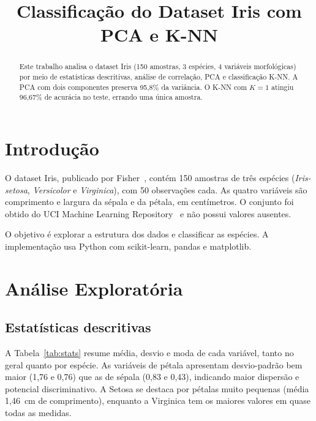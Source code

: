 \documentclass[conference]{IEEEtran}
\title{Classificação do Dataset Iris com PCA e K-NN}
\author{
\IEEEauthorblockN{Felipe Duarte Silva \quad Paulo Henrique Jankosz}
\IEEEauthorblockA{
GRR20231957 \quad GRR20220627\\
Departamento de Informática -- UFPR}
}
\begin{document}
\maketitle

\begin{abstract}
Este trabalho analisa o dataset Iris (150 amostras, 3 espécies, 4
variáveis morfológicas) por meio de estatísticas descritivas, análise de
correlação, PCA e classificação K-NN. A PCA com dois componentes
preserva 95,8\% da variância. O K-NN com $K=1$ atingiu 96,67\% de
acurácia no teste, errando uma única amostra.
\end{abstract}

\section{Introdução}

O dataset Iris, publicado por Fisher~\cite{fisher1936}, contém 150
amostras de três espécies (\textit{Iris-setosa}, \textit{Versicolor} e
\textit{Virginica}), com 50 observações cada. As quatro variáveis são
comprimento e largura da sépala e da pétala, em centímetros. O conjunto
foi obtido do UCI Machine Learning Repository~\cite{uci_iris} e não
possui valores ausentes.

O objetivo é explorar a estrutura dos dados e classificar as espécies.
A implementação usa Python com scikit-learn, pandas e
matplotlib.

\section{Análise Exploratória}

\subsection{Estatísticas descritivas}

A Tabela~\ref{tab:stats} resume média, desvio e moda de cada variável,
tanto no geral quanto por espécie. As variáveis de pétala apresentam
desvio-padrão bem maior (1,76 e 0,76) que as de sépala (0,83 e 0,43),
indicando maior dispersão e potencial discriminativo. A Setosa se
destaca por pétalas muito pequenas (média 1,46~cm de comprimento),
enquanto a Virginica tem os maiores valores em quase todas as medidas.
\end{document}
